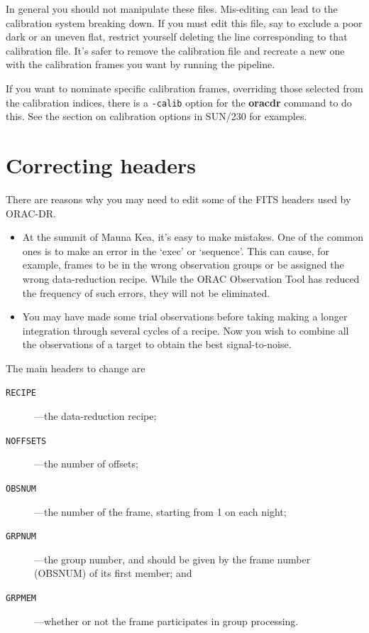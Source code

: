 \documentclass[twoside,11pt]{article}
\newenvironment{latexonly}{}{}
\newcommand{\xref}[3]{#1}
\newcommand{\xlabel}[1]{}
\renewcommand{\_}{\texttt{\symbol{95}}}
\newcommand{\ORACDR}{{\footnotesize ORAC-DR}}
\begin{document}
In general you should not manipulate these files.  Mis-editing can
lead to the calibration system breaking down.  If you must edit this
file, say to exclude a poor dark or an uneven flat, restrict yourself
deleting the line corresponding to that calibration file.  It's safer
to remove the calibration file and recreate a new one with the
calibration frames you want by running the pipeline.

If you want to nominate specific calibration frames, overriding those
selected from the calibration indices, there is a {\tt -calib} option
for the {\bf oracdr} command to do this.  See
\begin{latexonly}
the section on
\end{latexonly}
\xref{calibration options}{sun230}{calibration_options}
\begin{latexonly}
in SUN/230
\end{latexonly}
for examples.

\section{\xlabel{correcting_headers}Correcting headers}

There are reasons why you may need to edit some of the FITS headers
used by \ORACDR.

\begin{itemize}
\item  At the summit of Mauna Kea, it's easy to make mistakes.  One of
the common ones is to make an error in the `exec' or `sequence'.  This
can cause, for example, frames to be in the wrong observation groups
or be assigned the wrong data-reduction recipe.  While the ORAC
Observation Tool has reduced the frequency of such errors, they will
not be eliminated.

\item You may have made some trial observations before taking making
a longer integration through several cycles of a recipe.  Now you wish
to combine all the observations of a target to obtain the best
signal-to-noise.  
\end{itemize}

The main headers to change are
\begin{description}
\item [{\tt RECIPE}]---the data-reduction recipe;
\item [{\tt NOFFSETS}]---the number of offsets;
\item [{\tt OBSNUM}]---the number of the frame, starting from 1 on
each night;
\item [{\tt GRPNUM}]---the group number, and should be
given by the frame number (OBSNUM) of its first member; and
\item [{\tt GRPMEM}]---whether or not the frame participates in group
processing.
\end{description}
\end{document}
